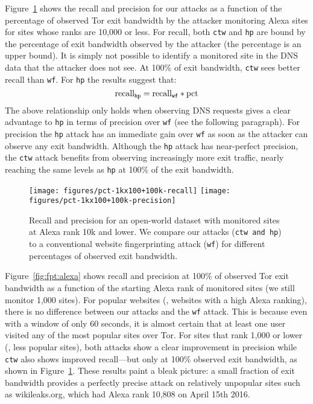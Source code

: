 Figure~\ref{fig:fpt:torpct} shows the recall and precision for our \name
attacks as a function of the percentage of observed Tor exit bandwidth by the
attacker monitoring Alexa sites for sites whose ranks are 10,000 or less.
For recall, both \texttt{ctw} and \texttt{hp} are bound by the
percentage of exit bandwidth observed by the attacker (the percentage is an
upper bound).
It is simply not possible to identify a monitored site in the DNS data that
the attacker does not see. At 100\% of exit bandwidth, \texttt{ctw} sees
better recall than \texttt{wf}. For \texttt{hp} the results suggest that:
\begin{equation}
	\label{eq:hprecall}
	\textnormal{recall}_{\texttt{hp}} = \textnormal{recall}_{\texttt{wf}} * \textnormal{pct}
\end{equation}
The above relationship only holds when observing DNS requests gives
a clear advantage to \texttt{hp} in terms of precision over \texttt{wf} (see
the following paragraph).
For precision the \texttt{hp} attack has an immediate gain over \texttt{wf} as
soon as the attacker can observe {any exit bandwidth}.
Although the \texttt{hp} attack has near-perfect precision, the
\texttt{ctw} attack benefits from observing increasingly more exit traffic,
nearly reaching the same levels as \texttt{hp} at 100\% of the exit bandwidth.


\begin{figure}[t]
\centering
\texttt{[image: figures/pct-1kx100+100k-recall]}
\texttt{[image: figures/pct-1kx100+100k-precision]}
\caption{Recall and precision for an open-world dataset with monitored sites
at Alexa rank 10k and lower. We compare our \name attacks (\texttt{ctw and
 \texttt{hp}}) to a conventional website fingerprinting attack (\texttt{wf}) for different
 percentages of observed exit bandwidth. }
\label{fig:fpt:torpct}
\end{figure}


Figure~\ref{fig:fpt:alexa} shows recall and precision at 100\% of
observed Tor exit bandwidth as a function of the starting Alexa rank of
monitored sites (we still monitor 1,000 sites).
For popular websites (\ie, websites with a high Alexa ranking),
there is no difference between our attacks and the
\texttt{wf} attack. This is because even with a window of only 60 seconds,
it is almost certain that at least one user visited any of the most popular
sites over Tor. For sites that rank 1,000 or lower (\ie, less popular sites),
both \name attacks show a clear improvement in precision while
\texttt{ctw} also shows improved recall---but only at 100\% observed exit
bandwidth, as shown in Figure~\ref{fig:fpt:torpct}.
These results paint a bleak picture: a small fraction of exit
bandwidth provides a perfectly precise attack on relatively
{unpopular} sites such as wikileaks.org, which had Alexa rank
10,808 on April 15th 2016.

